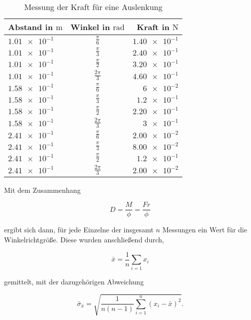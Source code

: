 \begin{table}
\centering
\caption{Messung der Kraft für eine Auslenkung}
\label{tab: winkelricht}
\renewcommand{\arraystretch}{1.2}
\begin{tabular}{lcr}
	\toprule
	Abstand in $\si{\meter}$ & Winkel in $\mathrm{rad}$ & Kraft in $\si{\newton}$ \\
	\midrule
	$\num{1.01e-1}$ & $\frac{\pi}{6}$ & $\num{1.40e-1}$ \\
	$\num{1.01e-1}$ & $\frac{\pi}{3}$ & $\num{2.40e-1}$ \\
	$\num{1.01e-1}$ & $\frac{\pi}{2}$ & $\num{3.20e-1}$ \\
	$\num{1.01e-1}$ & $\frac{2\pi}{3}$ & $\num{4.60e-1}$ \\
	$\num{1.58e-1}$ & $\frac{\pi}{6}$ & $\num{6e-2}$ \\
	$\num{1.58e-1}$ & $\frac{\pi}{3}$ & $\num{1.2e-1}$ \\
	$\num{1.58e-1}$ & $\frac{\pi}{2}$ & $\num{2.20e-1}$ \\
	$\num{1.58e-1}$ & $\frac{2\pi}{3}$ & $\num{3e-1}$ \\
	$\num{2.41e-1}$ & $\frac{\pi}{6}$ & $\num{2.00e-2}$ \\
	$\num{2.41e-1}$ & $\frac{\pi}{3}$ & $\num{8.00e-2}$ \\
	$\num{2.41e-1}$ & $\frac{\pi}{2}$ & $\num{1.2e-1}$ \\
	$\num{2.41e-1}$ & $\frac{2\pi}{3}$ & $\num{2.00e-2}$ \\
	\bottomrule
\end{tabular}
\end{table}

Mit dem Zusammenhang

\begin{equation*}
D=\frac{M}{\phi}=\frac{Fr}{\phi}
\end{equation*}

ergibt sich dann, für jede Einzelne der insgesamt $n$ Messungen ein Wert für die Winkelrichtgröße.
Diese wurden anschließend durch,

\begin{equation}
\label{eq:mittel}
\bar{x}=\frac{1}{n}\sum_{i=1}x_i
\end{equation}

gemittelt, mit der dazugehörigen Abweichung

\begin{equation}
\label{eq:stand_ab}
\bar{\sigma}_{\bar{x}}=\sqrt{\frac{1}{n(n-1)}\sum_{i=1}^{n}(x_i-\bar{x})^2}.
\end{equation}

